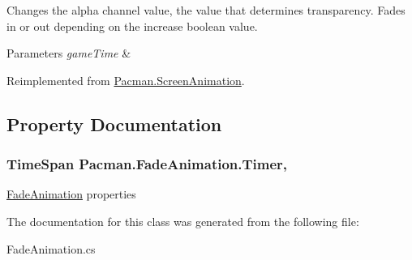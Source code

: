 Changes the alpha channel value, the value that determines transparency. Fades in or out depending on the increase boolean value. 


\begin{DoxyParams}{Parameters}
{\em game\-Time} & \\
\hline
\end{DoxyParams}


Reimplemented from \hyperlink{class_pacman_1_1_screen_animation_af381913622005dfb6b759f7495b37ded}{Pacman.\-Screen\-Animation}.



\subsection{Property Documentation}
\hypertarget{class_pacman_1_1_fade_animation_aa161d233c498500c1abc81b15206a53f}{
\subsubsection[{Timer}]{\setlength{\rightskip}{0pt plus 5cm}Time\-Span Pacman.\-Fade\-Animation.\-Timer\hspace{0.3cm}{\ttfamily [get]}, {\ttfamily [set]}}}\label{class_pacman_1_1_fade_animation_aa161d233c498500c1abc81b15206a53f}


\hyperlink{class_pacman_1_1_fade_animation}{Fade\-Animation} properties 



The documentation for this class was generated from the following file\-:\begin{DoxyCompactItemize}
\item 
Fade\-Animation.\-cs\end{DoxyCompactItemize}
